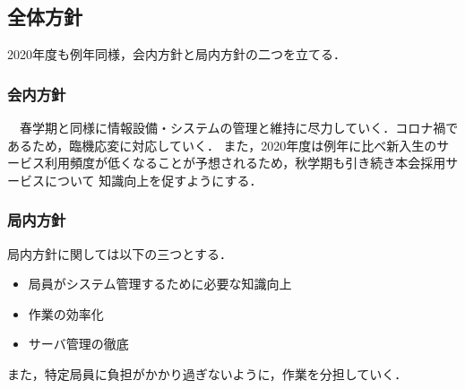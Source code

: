 \subsection*{全体方針}

2020年度も例年同様，会内方針と局内方針の二つを立てる．
\subsubsection*{会内方針}
　春学期と同様に情報設備・システムの管理と維持に尽力していく．コロナ禍であるため，臨機応変に対応していく．
また，2020年度は例年に比べ新入生のサービス利用頻度が低くなることが予想されるため，秋学期も引き続き本会採用サービスについて
知識向上を促すようにする．

\subsubsection*{局内方針}
局内方針に関しては以下の三つとする．
\begin{itemize}
    \item 局員がシステム管理するために必要な知識向上
    \item 作業の効率化
    \item サーバ管理の徹底
\end{itemize}
また，特定局員に負担がかかり過ぎないように，作業を分担していく．

